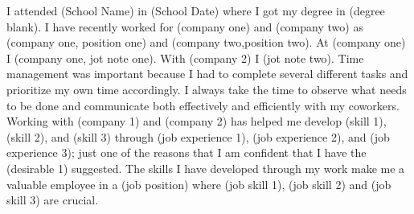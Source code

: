 I attended (School Name) in (School Date) where I got my degree in (degree blank). I have recently worked for (company one) and (company two) as (company one, position one) and (company two,position two). At (company one) I (company one, jot note one). With (company 2) I (jot note two). Time management was important because I had to complete several different tasks and prioritize my own time accordingly. I always take the time to observe what needs to be done and communicate both effectively and efficiently with my coworkers. Working with (company 1) and (company 2) has helped me develop (skill 1), (skill 2), and (skill 3) through (job experience 1), (job experience 2), and (job experience 3); just one of the reasons that I am confident that I have the (desirable 1) suggested. The skills I have developed through my work make me a valuable employee in a (job position) where (job skill 1), (job skill 2) and (job skill 3) are crucial.